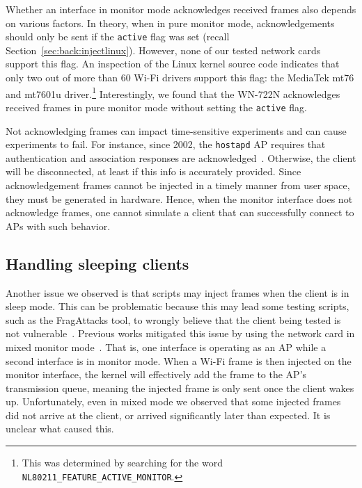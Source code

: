 \documentclass[sigconf]{acmart}
\newcommand{\wifi}{\mbox{Wi-Fi}}
\newcommand{\red}[1]{\textcolor{red}{#1}}
\begin{document}
Whether an interface in monitor mode acknowledges received frames also depends on various factors.
In theory, when in pure monitor mode, acknowledgements should only be sent if the \verb|active| flag was set (recall Section~\ref{sec:back:injectlinux}).
However, none of our tested network cards support this flag.
An inspection of the Linux kernel source code indicates that only two out of more than 60 \wifi{} drivers support this flag: the MediaTek mt76 and mt7601u driver.\footnote{This was determined by searching for the word \texttt{NL80211\_FEATURE\_ACTIVE\_MONITOR}.}
Interestingly, we found that the WN-722N acknowledges received frames in pure monitor mode without setting the \verb|active| flag.

Not acknowledging frames can impact time-sensitive experiments and can cause experiments to fail.
For instance, since 2002, the \verb|hostapd| AP requires that authentication and association responses are acknowledged~\cite{linux-hostap-checkack}.
Otherwise, the client will be disconnected, at least if this info is accurately provided.
Since acknowledgement frames cannot be injected in a timely manner from user space, they must be generated in hardware. Hence, when the monitor interface does not acknowledge frames, one cannot simulate a client that can successfully connect to APs with such behavior.

\subsection{Handling sleeping clients}
\label{sec:problems:sleep}

Another issue we observed is that scripts may inject frames when the client is in sleep mode.
This can be problematic because this may lead some testing scripts, such as the FragAttacks tool, to wrongly believe that the client being tested is not vulnerable~\cite{vanhoef-usenix2021-fragattacks}.
Previous works mitigated this issue by using the network card in mixed monitor mode~\cite{vanhoef-usenix2021-fragattacks,schepers2021framework}.
That is, one interface is operating as an AP while a second interface is in monitor mode.
When a \wifi{} frame is then injected on the monitor interface,
the kernel will effectively add the frame to the AP's transmission queue, meaning the injected frame is only sent once the client wakes up.
Unfortunately, even in mixed mode we observed that some injected frames did not arrive at the client, or arrived significantly later than expected.
It is unclear what caused this.
\end{document}
